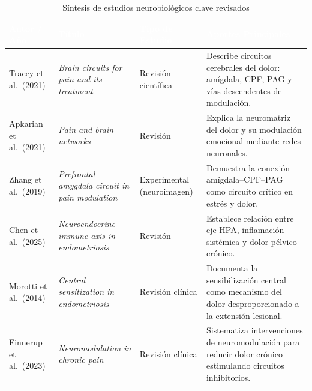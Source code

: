 \documentclass[12pt, a4paper]{article}
\renewcommand{\arraystretch}{1.4}
\begin{document}
\begin{table}[ht]
\centering
\caption{Síntesis de estudios neurobiológicos clave revisados}
\label{tab:estudios}
\small
\renewcommand{\arraystretch}{1.5}
\begin{tabularx}{\textwidth}{
  >{\raggedright\arraybackslash}p{3.0cm}
  >{\raggedright\arraybackslash}p{3.8cm}
  >{\raggedright\arraybackslash}p{2.4cm}
  >{\raggedright\arraybackslash}X
}
\toprule
\rowcolor{darkblue}
\textcolor{white}{\textbf{Autor / Año}} &
\textcolor{white}{\textbf{Título}} &
\textcolor{white}{\textbf{Tipo de Estudio}} &
\textcolor{white}{\textbf{Aportes Principales}} \\
\midrule
\rowcolor{rowA}
Tracey et al.\ (2021) &
\textit{Brain circuits for pain and its treatment} &
Revisión científica &
Describe circuitos cerebrales del dolor: amígdala, CPF, PAG y vías descendentes de modulación. \\

\rowcolor{rowB}
Apkarian et al.\ (2021) &
\textit{Pain and brain networks} &
Revisión &
Explica la neuromatriz del dolor y su modulación emocional mediante redes neuronales. \\

\rowcolor{rowA}
Zhang et al.\ (2019) &
\textit{Prefrontal-amygdala circuit in pain modulation} &
Experimental (neuroimagen) &
Demuestra la conexión amígdala–CPF–PAG como circuito crítico en estrés y dolor. \\

\rowcolor{rowB}
Chen et al.\ (2025) &
\textit{Neuroendocrine–immune axis in endometriosis} &
Revisión &
Establece relación entre eje HPA, inflamación sistémica y dolor pélvico crónico. \\

\rowcolor{rowA}
Morotti et al.\ (2014) &
\textit{Central sensitization in endometriosis} &
Revisión clínica &
Documenta la sensibilización central como mecanismo del dolor desproporcionado a la extensión lesional. \\

\rowcolor{rowB}
Finnerup et al.\ (2023) &
\textit{Neuromodulation in chronic pain} &
Revisión clínica &
Sistematiza intervenciones de neuromodulación para reducir dolor crónico estimulando circuitos inhibitorios. \\
\bottomrule
\end{tabularx}
\end{table}

\end{document}
